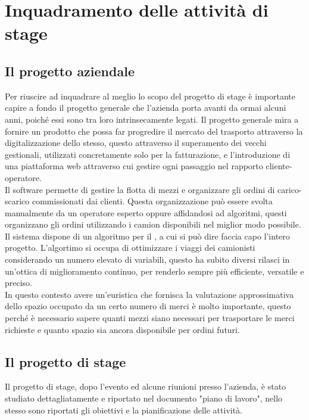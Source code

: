 
\hypertarget{(chap:capitolo3)}{}
\chapter{Inquadramento delle attività di stage}
\section{Il progetto aziendale}
Per riuscire ad inquadrare al meglio lo scopo del progetto di stage è importante capire a fondo il progetto generale che l'azienda porta avanti da ormai alcuni anni, poiché essi sono tra loro intrinsecamente legati. Il progetto generale mira a fornire un prodotto che possa far progredire il mercato del trasporto attraverso la digitalizzazione dello stesso, questo attraverso il superamento dei vecchi gestionali, utilizzati concretamente solo per la fatturazione, e l'introduzione di una piattaforma web attraverso cui gestire ogni passaggio nel rapporto cliente-operatore.\\
Il software permette di gestire la flotta di mezzi e organizzare gli ordini di carico-scarico commissionati dai clienti. Questa organizzazione può essere svolta manualmente da un operatore esperto oppure affidandosi ad algoritmi, questi organizzano gli ordini utilizzando i camion disponibili nel miglior modo possibile.\\
Il sistema dispone di un algoritmo per il , a cui si può dire faccia capo l'intero progetto. L'algortimo si occupa di ottimizzare i viaggi dei camionisti considerando un numero elevato di variabili, questo ha subito diversi rilasci in un'ottica di miglioramento continuo, per renderlo sempre più efficiente, versatile e preciso.\\
In questo contesto avere un'euristica che fornisca la valutazione approssimativa dello spazio occupato da un certo numero di merci è molto importante, questo perché è necessario sapere quanti mezzi siano necessari per trasportare le merci richieste e quanto spazio sia ancora disponibile per ordini futuri.

\section{Il progetto di stage}
Il progetto di stage, dopo l'evento  ed alcune riunioni presso l'azienda, è stato studiato dettagliatamente e riportato nel documento "piano di lavoro", nello stesso sono riportati gli obiettivi e la pianificazione delle attività.

